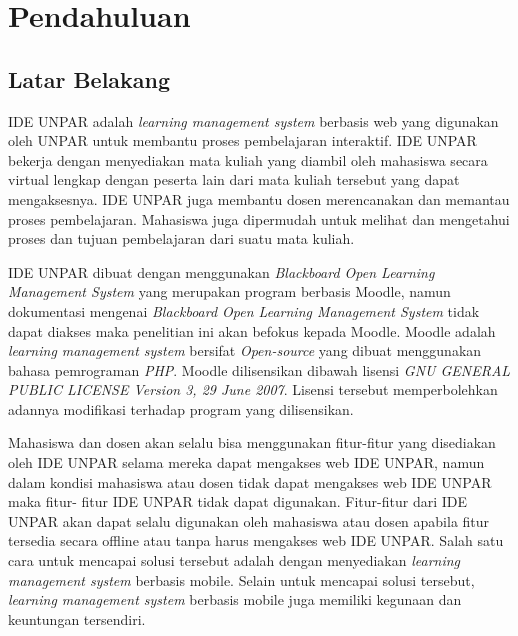 \chapter{Pendahuluan}
\label{chap:intro}
   
\section{Latar Belakang}
\label{sec:label}

IDE UNPAR adalah \textit{learning management system} berbasis web yang digunakan oleh UNPAR untuk membantu proses pembelajaran interaktif. IDE UNPAR bekerja dengan menyediakan mata kuliah yang diambil oleh mahasiswa secara virtual lengkap dengan peserta lain dari mata kuliah tersebut yang dapat mengaksesnya. IDE UNPAR juga membantu dosen merencanakan dan memantau proses pembelajaran. Mahasiswa juga dipermudah untuk melihat dan mengetahui proses dan tujuan pembelajaran dari suatu mata kuliah. 

IDE UNPAR dibuat dengan menggunakan \textit{Blackboard Open Learning Management System} yang merupakan program berbasis Moodle, namun dokumentasi mengenai \textit{Blackboard Open Learning Management System} tidak dapat diakses maka penelitian ini akan befokus kepada Moodle. Moodle adalah \textit{learning management system} bersifat \textit{Open-source} yang dibuat menggunakan bahasa pemrograman \textit{PHP}. Moodle dilisensikan dibawah lisensi \textit{GNU GENERAL PUBLIC LICENSE Version 3, 29 June 2007}. Lisensi tersebut memperbolehkan adannya modifikasi terhadap program yang dilisensikan.

Mahasiswa dan dosen akan selalu bisa menggunakan fitur-fitur yang disediakan oleh IDE UNPAR selama mereka dapat mengakses web IDE UNPAR, namun dalam kondisi mahasiswa atau dosen tidak dapat mengakses web IDE UNPAR maka fitur- fitur IDE UNPAR tidak dapat digunakan. Fitur-fitur dari IDE UNPAR akan dapat selalu digunakan oleh mahasiswa atau dosen apabila fitur tersedia secara offline atau tanpa harus mengakses web IDE UNPAR. Salah satu cara untuk mencapai solusi tersebut adalah dengan menyediakan \textit{learning management system} berbasis  mobile. Selain untuk mencapai solusi tersebut, \textit{learning management system} berbasis mobile juga memiliki kegunaan dan keuntungan tersendiri\cite{mlms:stat}.


